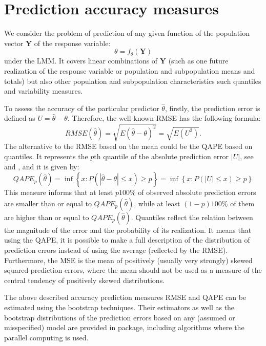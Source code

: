 \section{Prediction accuracy measures} \label{PAM}

We consider the problem of prediction of any given function of the population vector $\mathbf{Y}$ of the response variable:
\begin{equation}\label{theta}
\theta = f_{\theta}(\mathbf{Y})
\end{equation}
under the LMM. It covers linear combinations of $\mathbf{Y}$ (such as one future realization of the response variable or population and subpopulation means and totals) but also other population and subpopulation characteristics such quantiles and variability measures.


To assess the accuracy of the particular predictor $\hat \theta$, firstly, the prediction error is defined as $U=\hat{\theta}-\theta$. Therefore, the well-known RMSE has the following formula:
\begin{equation}\label{eq0}
	RMSE(\hat{\theta})=\sqrt{E(\hat{\theta}-\theta)^{2}}=\sqrt{E({{U}^{2}})}.
\end{equation}
The alternative to the RMSE based on the mean could be the QAPE based on quantiles. It represents the $p$th quantile of the absolute prediction error $|U|$, see \cite{zadlo2013parametric} and  \cite{zadlo2020bootstrap}, and it is given by:
\begin{equation}\label{eq1}
	QAPE_p(\hat{\theta}) = \inf \left\{ {x:P\left( {\left| {{\hat{\theta}-\theta}} \right| \le x} \right) \ge p} \right\} =\inf \left\{ {x:P\left( {\left| {{U}} \right| \le x} \right) \ge p} \right\}
\end{equation}
This measure informs that at least $p100\%$ of observed absolute prediction errors are smaller than or equal to $QAPE_p(\hat{\theta})$, while at least $(1-p)100\%$ of them are higher than or equal to $QAPE_p(\hat{\theta})$. Quantiles reflect the relation between the magnitude of the error and the probability of its realization. It means that using the QAPE, it is possible to make a full description of the distribution of prediction errors instead of using the average (reflected by the RMSE). Furthermore, the MSE is the mean of positively (usually very strongly) skewed squared prediction errors, where the mean should not be used as a measure of the central tendency of positively skewed distributions.

The above described accuracy prediction measures RMSE and QAPE can be estimated using the bootstrap techniques. Their estimators as well as the bootstrap distributions of the prediction errors based on any (assumed or misspecified) model are provided in  package, including algorithms where the parallel computing is used.


